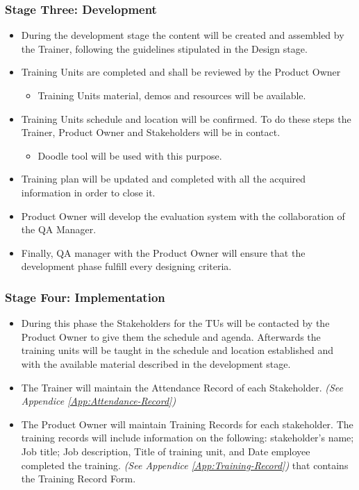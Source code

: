 \documentclass{template/openetcs_article}
\begin{document}
\subsubsection{Stage Three: Development}

\begin{itemize}
\item During the development stage the content will be created and assembled by the Trainer, following the guidelines stipulated in the Design stage.
\item Training Units are completed and shall be reviewed by the Product Owner
\begin{itemize}
\item Training Units material, demos and resources will be available.
\end{itemize}
\item Training Units schedule and location will be confirmed. To do these steps the Trainer, Product Owner and Stakeholders will be in contact.
\begin{itemize}
\item Doodle tool will be used with this purpose.
\end{itemize}
\item Training plan will be updated and completed with all the acquired information in order to close it.
\item Product Owner will develop the evaluation system with the collaboration of the QA Manager.
\item Finally, QA manager with the Product Owner will ensure that the development phase fulfill every designing criteria. 
\end{itemize}

\subsubsection{Stage Four: Implementation}
\begin{itemize}
\item During this phase the Stakeholders for the TUs will be contacted by the Product Owner to give them the schedule and agenda. Afterwards the training units will be taught in the schedule and location established and with the available material described in the development stage.
\item The Trainer will maintain the Attendance Record of each Stakeholder. {\it {(See Appendice \ref{App:Attendance-Record})}}
\item The Product Owner will maintain Training Records for each stakeholder. The training records will include information on the following: stakeholder’s name; Job title; Job description, Title of training unit, and Date employee completed the training. {\it {(See Appendice \ref{App:Training-Record})}} that contains the Training Record Form. 
\end{itemize}
\end{document}
